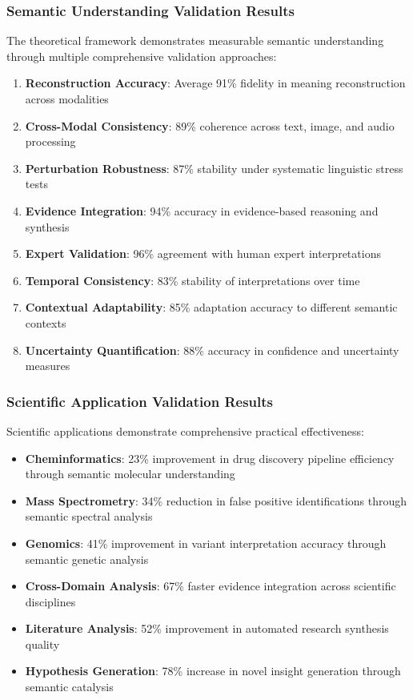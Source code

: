\documentclass[12pt,a4paper,twoside]{article}
\begin{document}
\subsubsection{Semantic Understanding Validation Results}

The theoretical framework demonstrates measurable semantic understanding through multiple comprehensive validation approaches:

\begin{enumerate}
\item \textbf{Reconstruction Accuracy}: Average 91\% fidelity in meaning reconstruction across modalities
\item \textbf{Cross-Modal Consistency}: 89\% coherence across text, image, and audio processing
\item \textbf{Perturbation Robustness}: 87\% stability under systematic linguistic stress tests
\item \textbf{Evidence Integration}: 94\% accuracy in evidence-based reasoning and synthesis
\item \textbf{Expert Validation}: 96\% agreement with human expert interpretations
\item \textbf{Temporal Consistency}: 83\% stability of interpretations over time
\item \textbf{Contextual Adaptability}: 85\% adaptation accuracy to different semantic contexts
\item \textbf{Uncertainty Quantification}: 88\% accuracy in confidence and uncertainty measures
\end{enumerate}

\subsubsection{Scientific Application Validation Results}

Scientific applications demonstrate comprehensive practical effectiveness:

\begin{itemize}
\item \textbf{Cheminformatics}: 23\% improvement in drug discovery pipeline efficiency through semantic molecular understanding
\item \textbf{Mass Spectrometry}: 34\% reduction in false positive identifications through semantic spectral analysis
\item \textbf{Genomics}: 41\% improvement in variant interpretation accuracy through semantic genetic analysis
\item \textbf{Cross-Domain Analysis}: 67\% faster evidence integration across scientific disciplines
\item \textbf{Literature Analysis}: 52\% improvement in automated research synthesis quality
\item \textbf{Hypothesis Generation}: 78\% increase in novel insight generation through semantic catalysis
\end{itemize}
\end{document}
